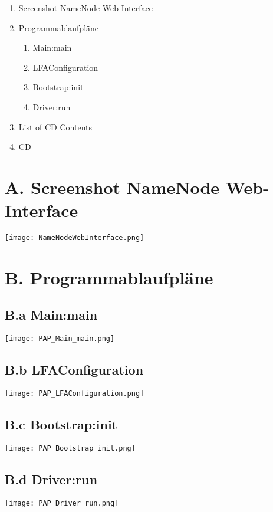 
\addchap{\langanhang}

{\Large
\begin{enumerate}[label=\Alph*.]
	\item Screenshot NameNode Web-Interface
	\item Programmablaufpläne
	\begin{enumerate}
		\item Main:main
		\item LFAConfiguration
		\item Bootstrap:init
		\item Driver:run
	\end{enumerate}
	\item List of CD Contents
	\item CD 
\end{enumerate}
}
\pagebreak

\section*{A. Screenshot NameNode Web-Interface}
\texttt{[image: NameNodeWebInterface.png]}
\pagebreak

\section*{B. Programmablaufpläne}

\subsection*{B.a Main:main}
\centering
\texttt{[image: PAP\_Main\_main.png]}
\pagebreak

\subsection*{B.b LFAConfiguration}
\centering
\texttt{[image: PAP\_LFAConfiguration.png]}
\pagebreak

\subsection*{B.c Bootstrap:init}
\centering
\texttt{[image: PAP\_Bootstrap\_init.png]}
\pagebreak

\subsection*{B.d Driver:run}
\centering
\texttt{[image: PAP\_Driver\_run.png]}
\pagebreak

